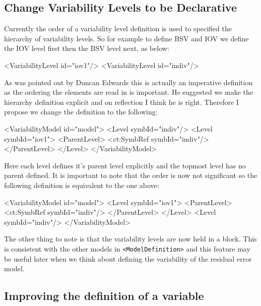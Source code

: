 \documentclass[a4paper,11pt]{article}
\newcommand{\xelem}[1]{\texttt{<#1>}\index{XML Element!\texttt{<#1>}}}
\begin{document}
\subsection{Change Variability Levels to be Declarative}

Currently the order of a variability level definition is used to
specified the hierarchy of variability levels. So for example to
define BSV and IOV we define the IOV level first then the BSV level
next, as below:
%
\begin{xmlcode}
<VariabilityLevel id="iov1"/>
<VariabilityLevel id="indiv"/>
\end{xmlcode}

As was pointed out by Duncan Edwards this is actually an imperative
definition as the ordering the elements are read in is important. He
suggested we make the hierarchy definition explicit and on reflection
I think he is right. Therefore I propose we change the definition to
the following:
%
\begin{xmlcode}
<VariabilityModel id="model">
    <Level symbId="indiv"/>
    <Level symbId="iov1">
        <ParentLevel>
            <ct:SymbRef symbId="indiv"/>
        </ParentLevel>
    </Level>
</VariabilityModel>
\end{xmlcode}

Here each level defines it's parent level explicitly and the topmost
level has no parent defined. It is important to note that the order is
now not significant so the following definition is equivalent to the
one above:
%
\begin{xmlcode}
<VariabilityModel id="model">
    <Level symbId="iov1">
        <ParentLevel>
            <ct:SymbRef symbId="indiv"/>
        </ParentLevel>
    </Level>
    <Level symbId="indiv"/>
</VariabilityModel>
\end{xmlcode}
%
The other thing to note is that the variability levels are now held in
a block. This is consistent with the other models in
\xelem{ModelDefinition} and this feature may be useful later when we
think about defining the variability of the residual error model.

\subsection{Improving the definition of a variable}
\end{document}
